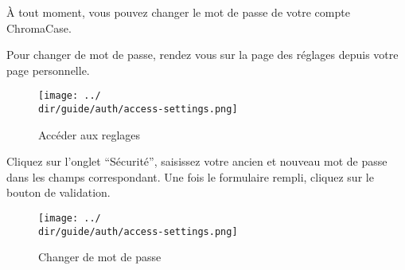 À tout moment, vous pouvez changer le mot de passe de votre compte ChromaCase.

Pour changer de mot de passe, rendez vous sur la page des réglages depuis votre page personnelle.

\begin{figure}[H]
	\texttt{[image: ../\\dir/guide/auth/access-settings.png]}
	\caption{Accéder aux reglages}
\end{figure}

Cliquez sur l’onglet “Sécurité”, saisissez votre ancien et nouveau mot de passe dans les champs correspondant. Une fois le formulaire rempli, cliquez sur le bouton de validation.

\begin{figure}[H]
	\texttt{[image: ../\\dir/guide/auth/access-settings.png]}
	\caption{Changer de mot de passe}
\end{figure}